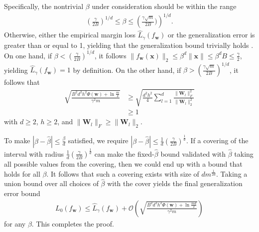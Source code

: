 \documentclass[journal]{IEEEtran} %
\def\vw{{\bm{w}}}
\def\vx{{\bm{x}}}
\def\mW{{\bm{W}}}
\newcommand{\Norm}[1]{\|#1\|}
\newcommand{\Abs}[1]{|#1|}
\begin{document}
Specifically, the nontrivial $\beta$ under consideration should be within the range
\begin{align}
    \left(\frac{\gamma}{2B}\right)^{1/d} \le \beta \le \left(\frac{\gamma \sqrt{m}}{2B})\right)^{1/d}.
\end{align}
Otherwise, either the empirical margin loss $\hat{L}_{\gamma}(f_{\vw})$ or the generalization error is greater than or equal to 1, yielding that the generalization bound trivially holds \cite{neyshabur2018pac,liao2020pac}. On one hand, if $\beta < \left(\frac{\gamma}{2B}\right)^{1/d} $, it follows $\Norm{f_{\vw}(\vx)}_2 \le \beta^d \Norm{\vx} \le \beta^d B \le \frac{\gamma}{2}$, yielding $\hat{L}_{\gamma}(f_{\vw})=1$ by definition. On the other hand, if $\beta > \left(\frac{\gamma \sqrt{m}}{2B}\right)^{1/d} $, it follows that
\begin{align}
    \sqrt{ \frac{B^2d^2h^2 \Phi(\vw) + \ln \frac{m}{\delta}}{\gamma^2m}} &\ge \sqrt{ \frac{d^2h^2 }{4} \sum_{l=1}^d \frac{\Norm{\mW_l}_F^2}{\Norm{\mW_l}_2^2}} \\
    & \ge 1
\end{align}
with $d \ge 2$, $h \ge 2$, and $\Norm{\mW_l}_F \ge \Norm{\mW_l}_2$.

To make $\Abs{\beta-\hat{\beta}} \le \frac{\beta}{d}$ satisfied, we require $\Abs{\beta-\hat{\beta}} \le \frac{1}{d}\left(\frac{\gamma}{2B}\right)^{\frac{1}{d}}$. If a covering of the interval with radius $\frac{1}{d}\left(\frac{\gamma}{2B}\right)^{\frac{1}{d}}$ can make the fixed-$\hat{\beta}$ bound validated with $\hat{\beta}$ taking all possible values from the covering, then we could end up with a bound that holds for all $\beta$. It follows that such a covering exists with size of $dm^{\frac{1}{2d}}$. Taking a union bound over all choices of $\hat{\beta}$ with the cover yields the final generalization error bound
\begin{align}
    L_0(f_{\vw}) \le \hat{L}_{\gamma}(f_{\vw}) + \mathcal{O} \left( \sqrt{ \frac{B^2d^2h^2 \Phi(\vw) + \ln \frac{md}{\delta}}{\gamma^2m}} \right)
\end{align}
for any $\beta$. 
This completes the proof.
\end{document}
